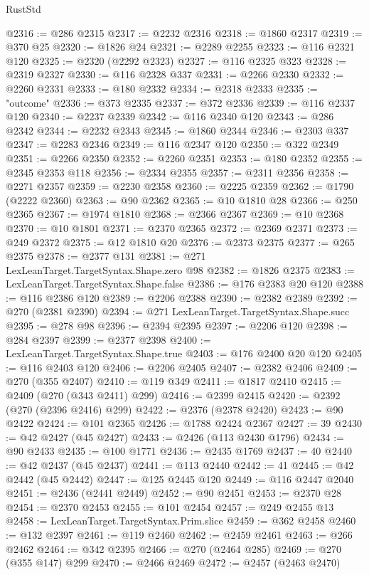 \begin{lexlean}{RustStd}
\begin{coremodule}
@2316 := @286 @2315
@2317 := @2232 @2316
@2318 := @1860 @2317
@2319 := @370 @25
@2320 := @1826 @24
@2321 := @2289 @2255
@2323 := @116 @2321 @120
@2325 := @2320 (@2292 @2323)
@2327 := @116 @2325 @323
@2328 := @2319 @2327
@2330 := @116 @2328 @337
@2331 := @2266 @2330
@2332 := @2260 @2331
@2333 := @180 @2332
@2334 := @2318 @2333
@2335 := "outcome"
@2336 := @373 @2335
@2337 := @372 @2336
@2339 := @116 @2337 @120
@2340 := @2237 @2339
@2342 := @116 @2340 @120
@2343 := @286 @2342
@2344 := @2232 @2343
@2345 := @1860 @2344
@2346 := @2303 @337
@2347 := @2283 @2346
@2349 := @116 @2347 @120
@2350 := @322 @2349
@2351 := @2266 @2350
@2352 := @2260 @2351
@2353 := @180 @2352
@2355 := @2345 @2353 @118
@2356 := @2334 @2355
@2357 := @2311 @2356
@2358 := @2271 @2357
@2359 := @2230 @2358
@2360 := @2225 @2359
@2362 := @1790 (@2222 @2360)
@2363 := @90 @2362
@2365 := @10 @1810 @28
@2366 := @250 @2365
@2367 := @1974 @1810
@2368 := @2366 @2367
@2369 := @10 @2368
@2370 := @10 @1801
@2371 := @2370 @2365
@2372 := @2369 @2371
@2373 := @249 @2372
@2375 := @12 @1810 @20
@2376 := @2373 @2375
@2377 := @265 @2375
@2378 := @2377 @131
@2381 := @271 LexLeanTarget.TargetSyntax.Shape.zero @98
@2382 := @1826 @2375
@2383 := LexLeanTarget.TargetSyntax.Shape.false
@2386 := @176 @2383 @20 @120
@2388 := @116 @2386 @120
@2389 := @2206 @2388
@2390 := @2382 @2389
@2392 := @270 (@2381 @2390)
@2394 := @271 LexLeanTarget.TargetSyntax.Shape.succ
@2395 := @278 @98
@2396 := @2394 @2395
@2397 := @2206 @120
@2398 := @284 @2397
@2399 := @2377 @2398
@2400 := LexLeanTarget.TargetSyntax.Shape.true
@2403 := @176 @2400 @20 @120
@2405 := @116 @2403 @120
@2406 := @2206 @2405
@2407 := @2382 @2406
@2409 := @270 (@355 @2407)
@2410 := @119 @349
@2411 := @1817 @2410
@2415 := @2409 (@270 (@343 @2411) @299)
@2416 := @2399 @2415
@2420 := @2392 (@270 (@2396 @2416) @299)
@2422 := @2376 (@2378 @2420)
@2423 := @90 @2422
@2424 := @101 @2365
@2426 := @1788 @2424 @2367
@2427 := 39
@2430 := @42 @2427 (@45 @2427)
@2433 := @2426 (@113 @2430 @1796)
@2434 := @90 @2433
@2435 := @100 @1771
@2436 := @2435 @1769
@2437 := 40
@2440 := @42 @2437 (@45 @2437)
@2441 := @113 @2440
@2442 := 41
@2445 := @42 @2442 (@45 @2442)
@2447 := @125 @2445 @120
@2449 := @116 @2447 @2040
@2451 := @2436 (@2441 @2449)
@2452 := @90 @2451
@2453 := @2370 @28
@2454 := @2370 @2453
@2455 := @101 @2454
@2457 := @249 @2455 @13
@2458 := LexLeanTarget.TargetSyntax.Prim.slice
@2459 := @362 @2458
@2460 := @132 @2397
@2461 := @119 @2460
@2462 := @2459 @2461
@2463 := @266 @2462
@2464 := @342 @2395
@2466 := @270 (@2464 @285)
@2469 := @270 (@355 @147) @299
@2470 := @2466 @2469
@2472 := @2457 (@2463 @2470)

\end{coremodule}
\end{lexlean}
